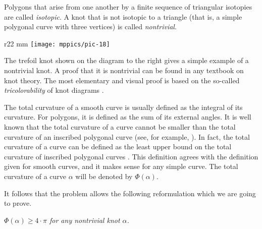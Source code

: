 Polygons that arise from one another by a finite sequence of
triangular isotopies are called \emph{isotopic}.
A knot that is not isotopic to a triangle (that is, a simple polygonal curve with three vertices) is called \emph{nontrivial}.

\begin{wrapfigure}{r}{22 mm}
\vskip-3mm
\centering
\texttt{[image: mppics/pic-18]}
\vskip0mm
\end{wrapfigure}

The trefoil knot shown on the diagram to the right gives a simple example of a nontrivial knot.
A proof that it is nontrivial can be found in any textbook on knot theory.
The most elementary and visual proof is based on the so-called \emph{tricolorability} of knot diagrams \cite[Section 1.5]{adams}.

The total curvature of a smooth curve is usually defined as the integral of its curvature.
For polygons, it is defined as the sum of its external angles.
It is well known that the total curvature of a curve cannot be smaller than the total curvature of an inscribed polygonal curve (see, for example, \cite{petrunin-zamora}).
In fact, the total curvature of a curve can be defined as the least upper bound on the total curvature of inscribed polygonal curves \cite{aleksandrov-reshetnyak, sullivan-curves}.
This definition agrees with the definition given for smooth curves, and it makes sense for any simple curve.
The total curvature of a curve $\alpha$ will be denoted by $\Phi(\alpha)$.

It follows that the problem allows the following reformulation which we are going to prove.

\textit{$\Phi(\alpha)\ge 4\cdot\pi$ for any nontrivial knot $\alpha$.}


